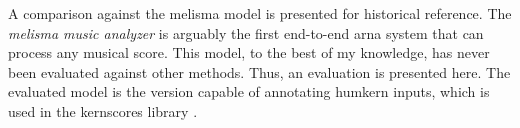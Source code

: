 
A comparison against the \gls{melisma} model is presented
for historical reference. The \emph{melisma music analyzer}
is arguably the first end-to-end \gls{arna} system that can
process any musical score.  This model, to the best of my
knowledge, has never been evaluated against other methods.
Thus, an evaluation is presented here. The evaluated model
is the version capable of annotating \gls{humkern} inputs,
which is used in the \gls{kernscores} library
\parencite{sapp2005online}.
